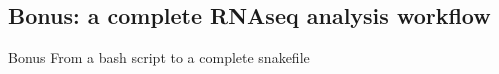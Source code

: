 \documentclass{beamer}
\begin{document}
\frame{\titlepage}

\subsection[SnakemakeEx2]{Bonus: a complete RNAseq analysis workflow}
\begin{frame}{Bonus}
    \huge{From a bash script to a complete snakefile}
\end{frame}

\end{document}
